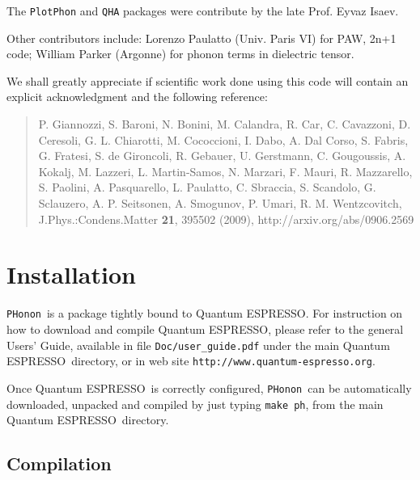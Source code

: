 \documentclass[12pt,a4paper]{article}
\def\qe{{\sc Quantum ESPRESSO}}
\def\PHonon{\texttt{PHonon}}
\begin{document}
The \texttt{PlotPhon} and \texttt{QHA} packages were contribute by the
late Prof. Eyvaz Isaev.

Other contributors include: Lorenzo Paulatto (Univ. Paris VI) for
PAW, 2n+1 code; William Parker (Argonne) for phonon terms in dielectric
tensor.

We shall greatly appreciate if scientific work done using this code will 
contain an explicit acknowledgment and the following reference:
\begin{quote}
P. Giannozzi, S. Baroni, N. Bonini, M. Calandra, R. Car, C. Cavazzoni,
D. Ceresoli, G. L. Chiarotti, M. Cococcioni, I. Dabo, A. Dal Corso,
S. Fabris, G. Fratesi, S. de Gironcoli, R. Gebauer, U. Gerstmann,
C. Gougoussis, A. Kokalj, M. Lazzeri, L. Martin-Samos, N. Marzari,
F. Mauri, R. Mazzarello, S. Paolini, A. Pasquarello, L. Paulatto,
C. Sbraccia, S. Scandolo, G. Sclauzero, A. P. Seitsonen, A. Smogunov,
P. Umari, R. M. Wentzcovitch, J.Phys.:Condens.Matter {\bf 21}, 395502 (2009),
http://arxiv.org/abs/0906.2569
\end{quote}

\section{Installation}

\PHonon\ is a package tightly bound to \qe.
For instruction on how to download and compile \qe, please refer
to the general Users' Guide, available in file \texttt{Doc/user\_guide.pdf}
under the main \qe\ directory, or in web site
\texttt{http://www.quantum-espresso.org}.

Once \qe\ is correctly configured, \PHonon\ can be automatically
downloaded, unpacked and compiled by
just typing \texttt{make ph}, from the main \qe\ directory.

\subsection{Compilation}
\end{document}

